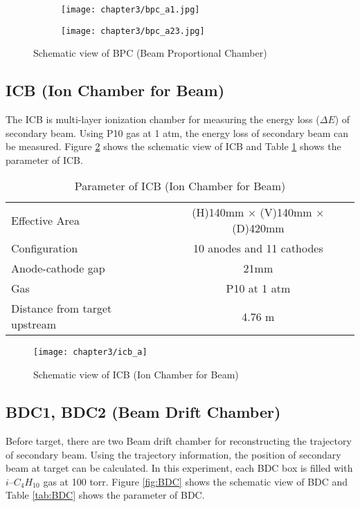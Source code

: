 \begin{figure}[h]
    \centering
    \begin{subfigure}[h]{\textwidth}
        \centering
        \texttt{[image: chapter3/bpc\_a1.jpg]}
    \end{subfigure}
    \begin{subfigure}[h]{\textwidth}
        \hspace{2.4cm}
        \texttt{[image: chapter3/bpc\_a23.jpg]}
    \end{subfigure}
        \caption{Schematic view of BPC (Beam Proportional Chamber) \cite{SAMURAI}}
        \label{fig:BPC}
\end{figure}

\clearpage

\subsection{ICB (Ion Chamber for Beam)}
The ICB is multi-layer ionization chamber for measuring the energy loss ($\Delta E$) of secondary beam. Using P10 gas at 1 atm, the energy loss of secondary beam can be measured. Figure \ref{fig:ICB} shows the schematic view of ICB and Table \ref{tab:ICB} shows the parameter of ICB.
\begin{table}[h]
    \centering
    \begin{tabular}{l|c}
        \hline
        Effective Area & (H)140mm $\times$ (V)140mm $\times$ (D)420mm\\
        Configuration & 10 anodes and 11 cathodes \\
        Anode-cathode gap & 21mm \\
        Gas & P10 at 1 atm\\
        Distance from target upstream & 4.76 m \\
        \hline
    \end{tabular}
    \caption{Parameter of ICB (Ion Chamber for Beam) \cite{SAMURAI}}
    \label{tab:ICB}
\end{table}

\begin{figure}[t]
    \centering
    \texttt{[image: chapter3/icb\_a]}
    \caption{Schematic view of ICB (Ion Chamber for Beam) \cite{SAMURAI}}
    \label{fig:ICB}
\end{figure}

\subsection{BDC1, BDC2 (Beam Drift Chamber)}
Before target, there are two Beam drift chamber for reconstructing the trajectory of secondary beam. Using the trajectory information, the position of secondary beam at target can be calculated. In this experiment, each BDC box is filled with $i$--${C}_{4} {H}_{10}$ gas at 100 torr. Figure \ref{fig:BDC} shows the schematic view of BDC and Table \ref{tab:BDC} shows the parameter of BDC.

